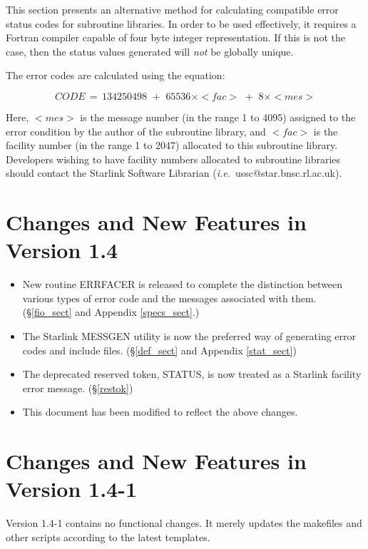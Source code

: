 \documentclass[twoside,11pt]{article}
\newcommand{\xlabel}[1]{}
\renewcommand{\_}{\texttt{\symbol{95}}}
\begin{document}
This section presents an alternative method for calculating compatible
error status codes for subroutine libraries.
In order to be used effectively, it requires a Fortran compiler capable of four
byte integer representation.
If this is not the case, then the status values generated will \emph{not} be
globally unique.

The error codes are calculated using the equation:

\begin {equation}
CODE \,= \, 134250498 \,\, + \,\, 65536\times <fac> \,\, + \,\,  8\times <mes> 
\end {equation}

Here, $<mes>$ is the message number (in the range 1 to 4095) assigned to the
error condition by the author of the subroutine library, and $<fac>$ is the
facility number (in the range 1 to 2047) allocated to this subroutine library.
Developers wishing to have facility numbers allocated to subroutine libraries 
should contact the Starlink Software Librarian 
(\textit{i.e.}\ ussc@star.bnsc.rl.ac.uk).

\section{\xlabel{changes_and_new_features_in_version_1_4}Changes and New Features in Version 1.4}
\begin{itemize}
\item New routine ERR\_FACER is released to complete the distinction between
various types of error code and the messages associated with them.
(\S\ref{fio_sect} and Appendix \ref{specs_sect}.)
\item The Starlink MESSGEN utility is now the preferred way of generating 
error codes and include files. (\S\ref{def_sect} and Appendix \ref{stat_sect})
\item The deprecated reserved token, STATUS, is now treated as a Starlink 
facility error message. (\S\ref{restok})
\item This document has been modified to reflect the above changes.
\end{itemize}

\section{\xlabel{changes_and_new_features_in_version_1_41}Changes and New Features in Version 1.4-1}
Version 1.4-1 contains no functional changes. It merely updates the makefiles
and other scripts according to the latest templates.
\end{document}
